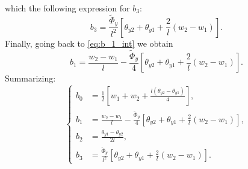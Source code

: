 \documentclass[a4paper,11pt]{article}
\begin{document}
which  the following expression for $b_3$:
\begin{equation}
b_3 = \frac{\tilde{\Phi}_y}{l^2} \left[ \theta_{y2} + \theta_{y1} + \frac{2}{l}(w_2-w_1) \right].
\end{equation}
Finally, going back to \eqref{eq:b_1_int} we obtain
\begin{equation}
b_1 = \frac{w_2 - w_1}{l} - \frac{\tilde{\Phi}_y}{4} \left[ \theta_{y2} + \theta_{y1} + \frac{2}{l}(w_2-w_1) \right].
\end{equation}
Summarizing:
\begin{equation}
\left\{
	\begin{aligned}
		b_0 & = \frac{1}{2} \left[ w_1 + w_2 + \frac{ l (\theta_{y2} - \theta_{y1}) }{4} \right], \\
		b_1 & = \frac{w_2 - w_1}{l} - \frac{\tilde{\Phi}_y}{4} \left[ \theta_{y2} + \theta_{y1} + \frac{2}{l}(w_2-w_1) \right], \\
		b_2 & = \frac{\theta_{y1} - \theta_{y2}}{2l}, \\
		b_3 & = \frac{\tilde{\Phi}_y}{l^2} \left[ \theta_{y2} + \theta_{y1} + \frac{2}{l}(w_2-w_1) \right].
	\end{aligned}
\right.
\end{equation}
\end{document}
